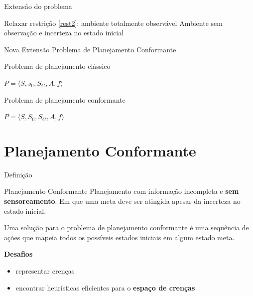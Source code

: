 \begin{frame}{Extensão do problema}
    \begin{block}{Relaxar restrição \ref{rest2}: ambiente totalmente observável}
        Ambiente sem observação e incerteza no estado inicial
    \end{block}
    
    \begin{block}{Nova Extensão}
        Problema de Planejamento Conformante
    \end{block}
    \pause
    \begin{block}{Problema de planejamento clássico}
        \begin{center}
            $P = \langle S, s_0, S_G, A, f \rangle$
        \end{center}
    \end{block}
    
    \begin{block}{Problema de planejamento conformante}
        \begin{center}
            $P = \langle S, S_0, S_G, A, f \rangle$
        \end{center}
    \end{block}
\end{frame}




\section{Planejamento Conformante}

\begin{frame}{Definição}
    \begin{block}{Planejamento Conformante}
    {  Planejamento com informação incompleta e \textbf{sem sensoreamento}. Em 
    que uma meta deve ser atingida apesar da incerteza no estado inicial.}
    \end{block}

    { \small Uma solução para o problema de planejamento conformante é uma sequência de ações 
    que mapeia todos os possíveis estados iniciais em algum estado meta.} \\
    \pause
    \begin{block}{ \alert{\bf Desafios}}
        \begin{itemize}
         \item representar crenças
         \item encontrar heurísticas eficientes para o \textbf{espaço de crenças}
        \end{itemize}
    
    \end{block}

\end{frame}

